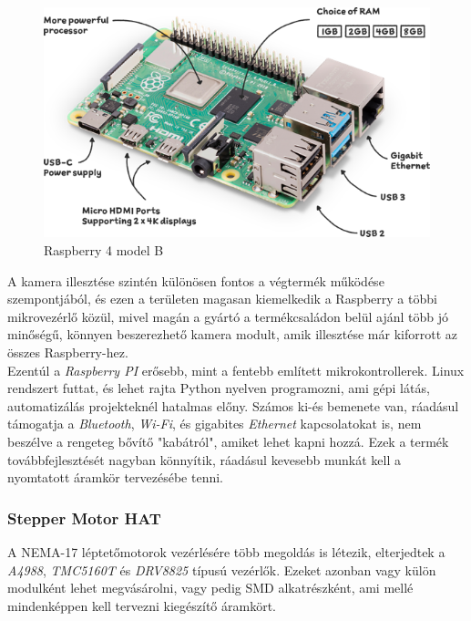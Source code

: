 \documentclass[12pt,a4paper]{article}
\begin{document}
\begin{figure}[h!]
	\centering
	\includegraphics[width=1\linewidth]{elek_raspberry4b}
	\caption{Raspberry 4 model B}
	\label{fig:elek_raspberry4b}
\end{figure}

A kamera illesztése szintén különösen fontos a végtermék működése szempontjából, és ezen a területen magasan kiemelkedik a Raspberry a többi mikrovezérlő közül, mivel magán a gyártó a termékcsaládon belül ajánl több jó minőségű, könnyen beszerezhető kamera modult, amik illesztése már kiforrott az összes Raspberry-hez.\\

Ezentúl a \textsl{Raspberry PI} erősebb, mint a fentebb említett mikrokontrollerek. Linux rendszert futtat, és lehet rajta Python nyelven programozni, ami gépi látás, automatizálás projekteknél hatalmas előny. Számos ki-és bemenete van, ráadásul támogatja a \textsl{Bluetooth}, \textsl{Wi-Fi}, és gigabites \textsl{Ethernet} kapcsolatokat is, nem beszélve a rengeteg bővítő "kabátról", amiket lehet kapni hozzá. Ezek a termék továbbfejlesztését nagyban könnyítik, ráadásul kevesebb munkát kell a nyomtatott áramkör tervezésébe tenni. \cite{raspberry4}

\subsubsection*{Stepper Motor HAT}
A NEMA-17 léptetőmotorok vezérlésére több megoldás is létezik, elterjedtek a \textsl{A4988}, \textsl{TMC5160T} és \textsl{DRV8825} típusú vezérlők. Ezeket azonban vagy külön modulként lehet megvásárolni, vagy pedig SMD alkatrészként, ami mellé mindenképpen kell tervezni kiegészítő áramkört. \\
\end{document}
